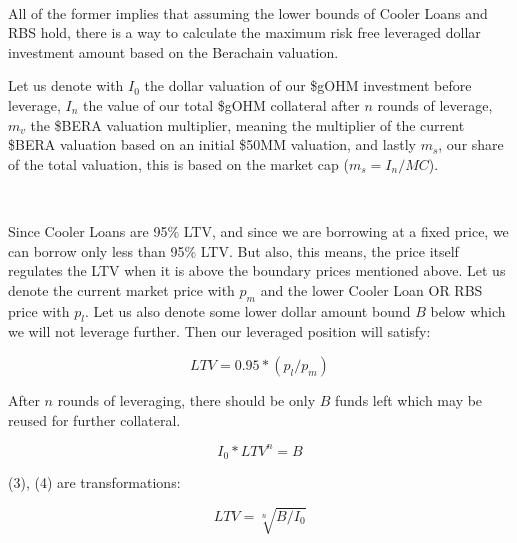\documentclass{article}
\begin{document}
\

All of the former implies that assuming the lower bounds of Cooler Loans and RBS hold, there is a way to calculate the maximum risk free leveraged dollar investment amount based on the Berachain valuation.


\newpage


Let us denote with $I_0$ the dollar valuation of our \$gOHM investment before leverage, $I_n$ the value of our total \$gOHM collateral after $n$ rounds of leverage, $m_v$ the \$BERA valuation multiplier, meaning the multiplier of the current \$BERA valuation based on an initial \$50MM valuation, and lastly $m_s$, our share of the total valuation, this is based on the market cap ($m_s = I_n / MC$).

\

Since Cooler Loans are 95\% LTV, and since we are borrowing at a fixed price, we can borrow only less than 95\% LTV. But also,  this means, the price itself regulates the LTV when it is above the boundary prices mentioned above. Let us denote the current market price with $p_m$ and the lower Cooler Loan OR RBS price with $p_l$. Let us also denote some lower dollar amount bound $B$ below which we will not leverage further. Then our leveraged position will satisfy:

\begin{equation}
    LTV = 0.95 * (p_l / p_m)
\end{equation}

After $n$ rounds of leveraging, there should be only $B$ funds left which may be reused for further collateral.

\begin{equation}
    I_0 * LTV^n = B
\end{equation}

(3), (4) are transformations:

\begin{equation}
    LTV = \sqrt[n]{B/I_0}
\end{equation}
\end{document}
